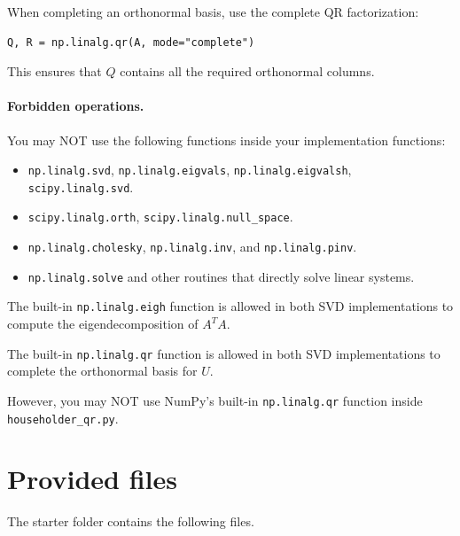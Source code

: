 \documentclass{ximera}
\begin{document}
When completing an orthonormal basis, use the complete QR
factorization:

\begin{verbatim}
Q, R = np.linalg.qr(A, mode="complete")
\end{verbatim}

This ensures that $Q$ contains all the required orthonormal columns.

\paragraph{Forbidden operations.}

You may NOT use the following functions inside your implementation
functions:

\begin{itemize}
    \item \texttt{np.linalg.svd}, \texttt{np.linalg.eigvals},
    \texttt{np.linalg.eigvalsh}, \texttt{scipy.linalg.svd}.
    \item \texttt{scipy.linalg.orth}, \texttt{scipy.linalg.null\_space}.
    \item \texttt{np.linalg.cholesky}, \texttt{np.linalg.inv},
    and \texttt{np.linalg.pinv}.
    \item \texttt{np.linalg.solve} and other routines that directly
    solve linear systems.
\end{itemize}

The built-in \texttt{np.linalg.eigh} function is allowed in both
SVD implementations to compute the eigendecomposition of $A^TA$.

The built-in \texttt{np.linalg.qr} function is allowed in both
SVD implementations to complete the orthonormal basis for $U$.

However, you may NOT use NumPy's built-in \texttt{np.linalg.qr}
function inside \texttt{householder\_qr.py}.

\section*{Provided files}

The starter folder contains the following files.
\end{document}
